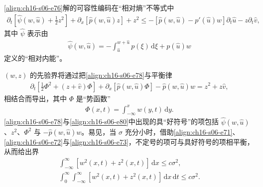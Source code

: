 \documentclass[../../main.tex]{subfiles}
\begin{document}
\eqref{align:ch16-s06-e76}解的可容性编码在“相对熵”不等式中
\begin{align}
\partial_t\left[\hat\psi(w,\hat u)+\frac12z^2\right]+\partial_x[\hat p(w,\hat u)z]+z^2\leqslant-[\hat p(w,\hat u)-p'(\hat u)w]\partial_t\hat u-z\partial_t\hat v,
\label{align:ch16-s06-e78}
\end{align}
其中 $\hat\psi$ 表示由
\begin{align}
\hat\psi(w,\hat u)=-\int_{\hat u}^{w+\hat u}p(\xi)\,\mathrm{d}\xi+p(\hat u)w
\label{align:ch16-s06-e79}
\end{align}
定义的“相对内能”。

$(w,z)$ 的先验界将通过把\eqref{align:ch16-s06-e78}与平衡律
\begin{align}
\partial_t\left[\frac12\Phi^2+(z+\hat v)\Phi\right]+\partial_x[\hat p(w,\hat u)\Phi]-\hat p(w,\hat u)w=z^2+z\hat v,
\label{align:ch16-s06-e80}
\end{align}
相结合而导出，其中 $\Phi$ 是“势函数”
\begin{align}
\Phi(x,t)=\int_{-\infty}^x w(y,t)\,\mathrm{d}y.
\label{align:ch16-s06-e81}
\end{align}
\eqref{align:ch16-s06-e78}与\eqref{align:ch16-s06-e80}中出现的具“好符号”的项包括 $\hat\psi(w,\hat u)$、$z^2$、$\Phi^2$ 与 $-\hat p(w,\hat u)w$。易见，当 $\sigma$ 充分小时，借助\eqref{align:ch16-s06-e71}、\eqref{align:ch16-s06-e72}与\eqref{align:ch16-s06-e73}，不定号的项可与具好符号的项相平衡，从而给出界
\begin{align}
\int_{-\infty}^{\infty}[w^2(x,t)+z^2(x,t)]\,\mathrm{d}x\leqslant c\sigma^2,
\label{align:ch16-s06-e82}\\
\int_0^\infty\int_{-\infty}^{\infty}[w^2(x,t)+z^2(x,t)]\,\mathrm{d}x\,\mathrm{d}t\leqslant c\sigma^2.
\label{align:ch16-s06-e83}
\end{align}
\end{document}

